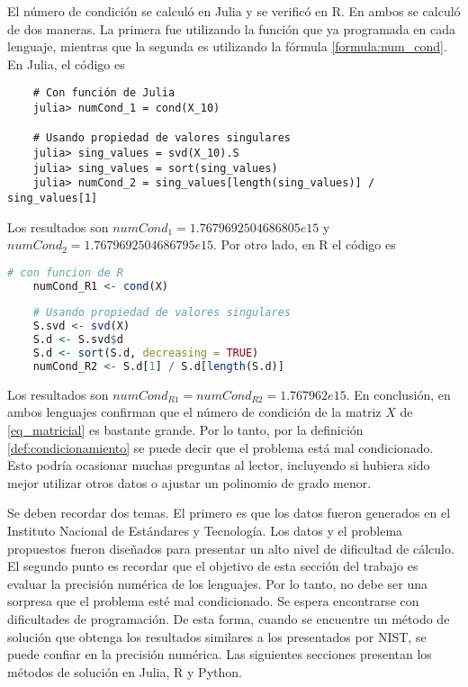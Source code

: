 El número de condición se calculó en \textsf{Julia} y se verificó en \textsf{R}. En ambos se calculó de dos maneras. La primera fue utilizando la función que ya programada en cada lenguaje, mientras que la segunda es utilizando la fórmula \ref{formula:num_cond}. En Julia, el código es 

\begin{verbatim}
	# Con función de Julia
	julia> numCond_1 = cond(X_10)
	
	# Usando propiedad de valores singulares
	julia> sing_values = svd(X_10).S
	julia> sing_values = sort(sing_values)
	julia> numCond_2 = sing_values[length(sing_values)] / sing_values[1]
\end{verbatim}

Los resultados son $numCond_1 = 1.7679692504686805e15$ y $numCond_2 = 1.7679692504686795e15$. Por otro lado, en R el código es 

\begin{lstlisting}[language=R]
	# con funcion de R
	numCond_R1 <- cond(X)
	
	# Usando propiedad de valores singulares
	S.svd <- svd(X)
	S.d <- S.svd$d
	S.d <- sort(S.d, decreasing = TRUE)
	numCond_R2 <- S.d[1] / S.d[length(S.d)]
\end{lstlisting}

Los resultados son $numCond_{R1} = numCond_{R2} = 1.767962e{15}$. En conclusión, en ambos lenguajes confirman que el número de condición de la matriz $X$ de \ref{eq_matricial} es bastante grande. Por lo tanto, por la definición \ref{def:condicionamiento} se puede decir que el problema está mal condicionado. Esto podría ocasionar muchas preguntas al lector, incluyendo si hubiera sido mejor utilizar otros datos o ajustar un polinomio de grado menor. 

Se deben recordar dos temas. El primero es que los datos fueron generados en el Instituto Nacional de Estándares y Tecnología. Los datos y el problema propuestos fueron diseñados para presentar un alto nivel de dificultad de cálculo. El segundo punto es recordar que el objetivo de esta sección del trabajo es evaluar la precisión numérica de los lenguajes. Por lo tanto, no debe ser una sorpresa que el problema esté mal condicionado. Se espera encontrarse con dificultades de programación. De esta forma, cuando se encuentre un método de solución que obtenga los resultados similares a los presentados por NIST, se puede confiar en la precisión numérica. Las siguientes secciones presentan los métodos de solución en \textsf{Julia, R} y \textsf{Python}. 

